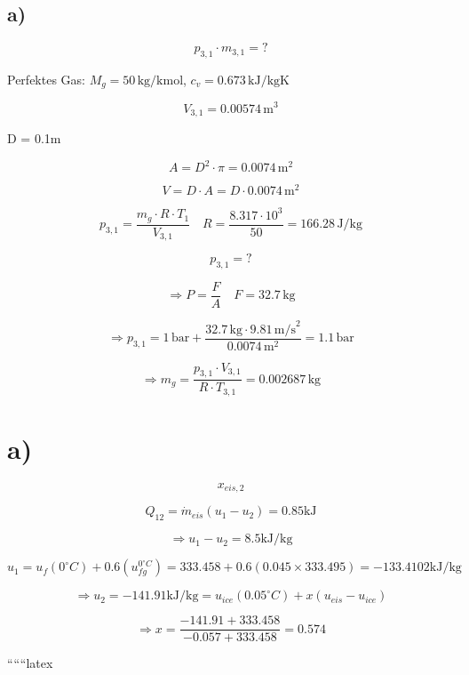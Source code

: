 

\subsection*{a)}

\[
p_{3,1} \cdot m_{3,1} = ?
\]

Perfektes Gas: \( M_g = 50 \, \text{kg/kmol} \), \( c_v = 0.673 \, \text{kJ/kgK} \)

\[
V_{3,1} = 0.00574 \, \text{m}^3
\]

D = 0.1m

\[
A = D^2 \cdot \pi = 0.0074 \, \text{m}^2
\]

\[
V = D \cdot A = D \cdot 0.0074 \, \text{m}^2
\]

\[
p_{3,1} = \frac{m_g \cdot R \cdot T_1}{V_{3,1}} \quad R = \frac{8.317 \cdot 10^3}{50} = 166.28 \, \text{J/kg}
\]

\[
p_{3,1} = ?
\]

\[
\Rightarrow P = \frac{F}{A} \quad F = 32.7 \, \text{kg}
\]

\[
\Rightarrow p_{3,1} = 1 \, \text{bar} + \frac{32.7 \, \text{kg} \cdot 9.81 \, \text{m/s}^2}{0.0074 \, \text{m}^2} = 1.1 \, \text{bar}
\]

\[
\Rightarrow m_g = \frac{p_{3,1} \cdot V_{3,1}}{R \cdot T_{3,1}} = 0.002687 \, \text{kg}
\]



\section*{a)}

\[
x_{eis,2}
\]

\[
Q_{12} = \dot{m}_{eis} (u_1 - u_2) = 0.85 \text{kJ}
\]

\[
\Rightarrow u_1 - u_2 = 8.5 \text{kJ/kg}
\]

\[
u_1 = u_f(0^\circ C) + 0.6 \left( u_{fg}^{0^\circ C} \right) = 333.458 + 0.6 \left( 0.045 \times 333.495 \right) = -133.4102 \text{kJ/kg}
\]

\[
\Rightarrow u_2 = -141.91 \text{kJ/kg} = u_{ice}(0.05^\circ C) + x \left( u_{eis} - u_{ice} \right)
\]

\[
\Rightarrow x = \frac{-141.91 + 333.458}{-0.057 + 333.458} = \boxed{0.574}
\]

``````latex
